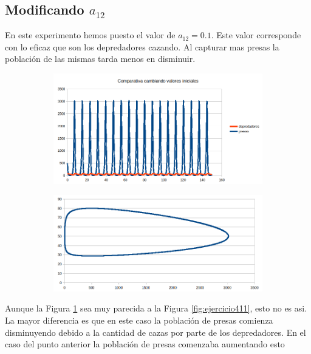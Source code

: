 \documentclass[12pt,a4paper]{article}
\begin{document}
\subsection{Modificando $a_{12}$}
En este experimento hemos puesto el valor de $a_{12}=0.1$.  Este valor corresponde con lo eficaz que son los depredadores cazando. Al capturar mas presas la población de las mismas tarda menos en disminuir. 
\begin{figure}[H]
	\centering
	\begin{subfigure}{.5\textwidth}
		\centering
	\includegraphics[width=1\linewidth]{images/ejercicio4_2_1}
		\caption{}
	\label{fig:ejercicio421}
	\end{subfigure}%
	\begin{subfigure}{.5\textwidth}
		\centering
	\includegraphics[width=1\linewidth]{images/ejercicio4_2_2}
		\caption{}
	\label{fig:ejercicio422}
	\end{subfigure}
	
	\label{fig:ejercicio42}
\end{figure}
Aunque la Figura \ref{fig:ejercicio421} sea muy parecida a la Figura \ref{fig:ejercicio411}, esto no es asi. La mayor diferencia es que en este caso la población de presas comienza disminuyendo debido a la cantidad de cazas por parte de los depredadores. En el caso del punto anterior la población de presas comenzaba aumentando esto 
\end{document}
